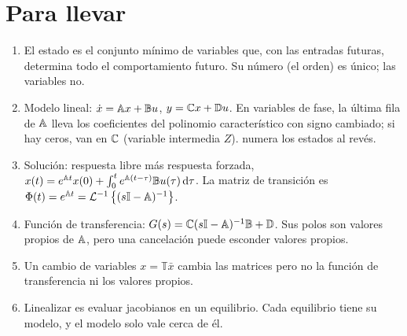 \section{Para llevar}
\label{sec:ee-cierre}

\begin{parallevar}
\begin{enumerate}
  \item El estado es el conjunto mínimo de variables que, con las entradas futuras, determina todo el comportamiento futuro. Su número (el orden) es único; las variables no.
  \item Modelo lineal: $\dot x=\mathbb{A} x+\mathbb{B} u$, $y=\mathbb{C} x+\mathbb{D} u$. En variables de fase, la última fila de $\mathbb{A}$ lleva los coeficientes del polinomio característico con signo cambiado; si hay ceros, van en $\mathbb{C}$ (variable intermedia $Z$).  numera los estados al revés.
  \item Solución: respuesta libre más respuesta forzada, $x(t)=e^{\mathbb{A} t}x(0)+\int_0^te^{\mathbb{A}(t-\tau)}\mathbb{B} u(\tau)\,\mathrm{d}\tau$. La matriz de transición es $\Phi(t)=e^{\mathbb{A} t}=\mathcal{L}^{-1}\left\{(s\mathbb{I}-\mathbb{A})^{-1}\right\}$.
  \item Función de transferencia: $G(s)=\mathbb{C}(s\mathbb{I}-\mathbb{A})^{-1}\mathbb{B}+\mathbb{D}$. Sus polos son valores propios de $\mathbb{A}$, pero una cancelación puede esconder valores propios.
  \item Un cambio de variables $x=\mathbb T\bar x$ cambia las matrices pero no la función de transferencia ni los valores propios.
  \item Linealizar es evaluar jacobianos en un equilibrio. Cada equilibrio tiene su modelo, y el modelo solo vale cerca de él.
\end{enumerate}
\end{parallevar}

